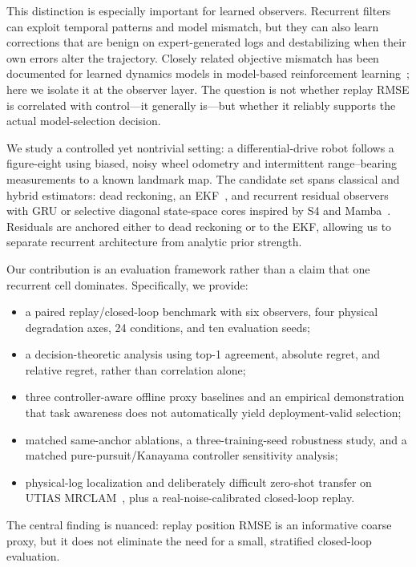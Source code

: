 \documentclass{article}
\begin{document}
This distinction is especially important for learned observers. Recurrent filters can exploit temporal patterns and model mismatch, but they can also learn corrections that are benign on expert-generated logs and destabilizing when their own errors alter the trajectory. Closely related objective mismatch has been documented for learned dynamics models in model-based reinforcement learning~\citep{lambert2020objective}; here we isolate it at the observer layer. The question is not whether replay RMSE is correlated with control---it generally is---but whether it reliably supports the actual model-selection decision.

We study a controlled yet nontrivial setting: a differential-drive robot follows a figure-eight using biased, noisy wheel odometry and intermittent range--bearing measurements to a known landmark map. The candidate set spans classical and hybrid estimators: dead reckoning, an EKF~\citep{thrun2005probabilistic}, and recurrent residual observers with GRU or selective diagonal state-space cores inspired by S4 and Mamba~\citep{gu2022s4,gu2024mamba}. Residuals are anchored either to dead reckoning or to the EKF, allowing us to separate recurrent architecture from analytic prior strength.

Our contribution is an evaluation framework rather than a claim that one recurrent cell dominates. Specifically, we provide:
\begin{itemize}
\item a paired replay/closed-loop benchmark with six observers, four physical degradation axes, 24 conditions, and ten evaluation seeds;
\item a decision-theoretic analysis using top-1 agreement, absolute regret, and relative regret, rather than correlation alone;
\item three controller-aware offline proxy baselines and an empirical demonstration that task awareness does not automatically yield deployment-valid selection;
\item matched same-anchor ablations, a three-training-seed robustness study, and a matched pure-pursuit/Kanayama controller sensitivity analysis;
\item physical-log localization and deliberately difficult zero-shot transfer on UTIAS MRCLAM~\citep{leung2011utias}, plus a real-noise-calibrated closed-loop replay.
\end{itemize}
The central finding is nuanced: replay position RMSE is an informative coarse proxy, but it does not eliminate the need for a small, stratified closed-loop evaluation.
\end{document}
